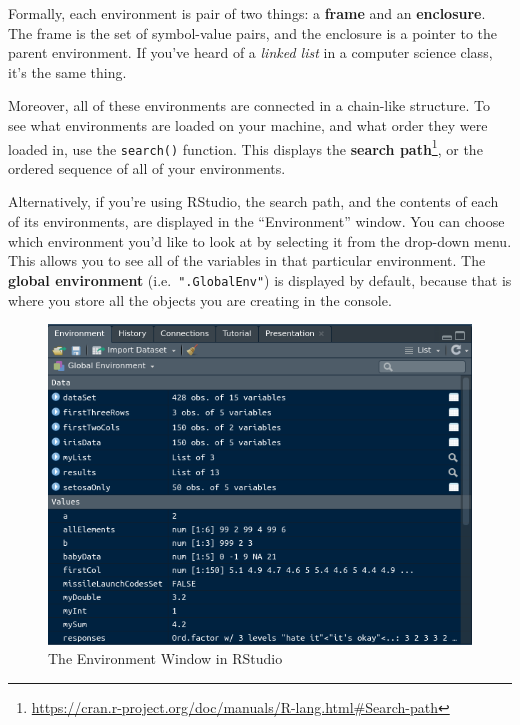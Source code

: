\documentclass[
  12pt,
  krantz2]{krantz}
\renewcommand{\href}[2]{#2\footnote{\url{#1}}}
\begin{document}
\begin{rmd-details}
Formally, each environment is pair of two things: a \textbf{frame} and an \textbf{enclosure}. The frame is the set of symbol-value pairs, and the enclosure is a pointer to the parent environment. If you've heard of a \emph{linked list} in a computer science class, it's the same thing.

\end{rmd-details}

Moreover, all of these environments are connected in a chain-like structure. To see what environments are loaded on your machine, and what order they were loaded in, use the \texttt{search()} function. This displays the \href{https://cran.r-project.org/doc/manuals/R-lang.html\#Search-path}{\textbf{search path}}, or the ordered sequence of all of your environments.

Alternatively, if you're using RStudio, the search path, and the contents of each of its environments, are displayed in the ``Environment'' window. You can choose which environment you'd like to look at by selecting it from the drop-down menu. This allows you to see all of the variables in that particular environment. The \textbf{global environment} (i.e.~\texttt{".GlobalEnv"}) is displayed by default, because that is where you store all the objects you are creating in the console.

\begin{figure}

{\centering \includegraphics[width=0.8\linewidth]{pics/environments_display_rstudio} 

}

\caption{The Environment Window in RStudio}\label{fig:rstudiodisp}
\end{figure}
\end{document}
